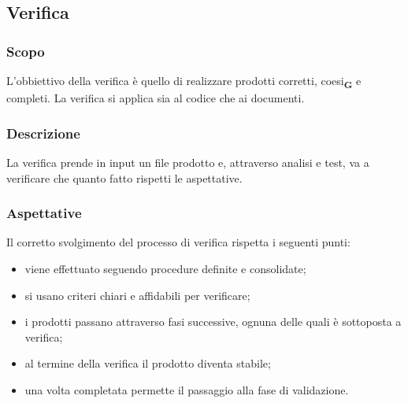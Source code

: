 \subsection{Verifica}
\subsubsection{Scopo}
L'obbiettivo della verifica è quello di realizzare prodotti corretti, coesi\textsubscript{\textbf{G}} e completi. La verifica si applica sia al codice che ai documenti.
\subsubsection{Descrizione}
La verifica prende in input un file prodotto e, attraverso analisi e test, va a verificare che quanto fatto rispetti le aspettative.
\subsubsection{Aspettative}
Il corretto svolgimento del processo di verifica rispetta i seguenti punti:
\begin{itemize}
    \item viene effettuato seguendo procedure definite e consolidate;
    \item si usano criteri chiari e affidabili per verificare;
    \item i prodotti passano attraverso fasi successive, ognuna delle quali è sottoposta a verifica;
    \item al termine della verifica il prodotto diventa stabile;
    \item una volta completata permette il passaggio alla fase di validazione.
\end{itemize}
